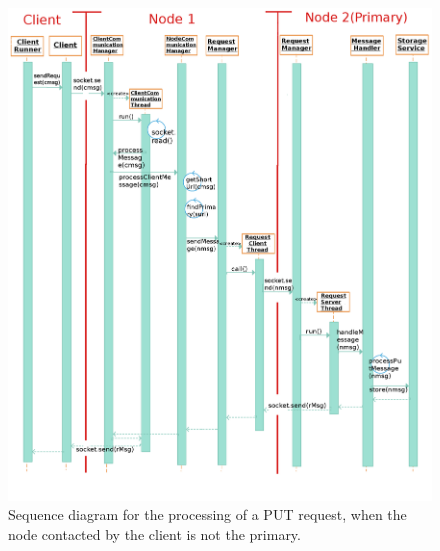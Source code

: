 \documentclass{article}
\begin{document}
\begin{figure}[H]
\centering
\includegraphics[scale=0.32]{sequence_diagram_complete}
\caption{Sequence diagram for the processing of a PUT request, when the node contacted by the client is not the primary.}
\label{fig:sequence_diagram_complete}
\end{figure}
\end{document}
